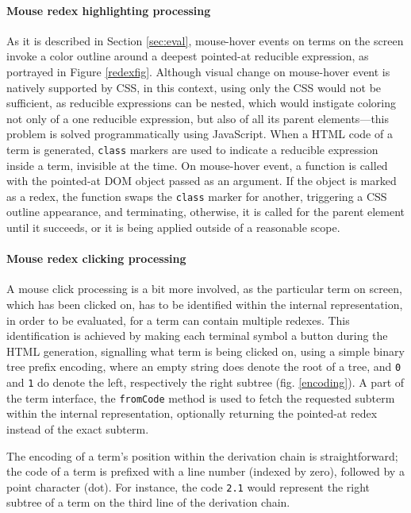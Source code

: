 \documentclass[table, a4paper, 10pt]{book}
\begin{document}
\paragraph{Mouse redex highlighting processing}
As it is described in Section \ref{sec:eval}, mouse-hover events on terms on the screen
invoke a color outline around a deepest pointed-at reducible expression, as
portrayed in Figure \ref{redexfig}. Although visual
change on mouse-hover event is natively supported by CSS,
in this context, using only the CSS would not be sufficient, as
reducible expressions can be nested, which would
instigate coloring not only of a one reducible expression, but also
of all its parent elements---this problem is solved
programmatically using JavaScript. When a HTML code of a term is 
generated, \texttt{class} markers are used to indicate a reducible expression
inside a term,
invisible at the time. On mouse-hover event, a function is called with
the pointed-at DOM object passed as an argument. If the object is marked
as a redex, the function swaps the \texttt{class} marker for another,
triggering a CSS outline appearance, and terminating, otherwise, it is called for the parent element
until it succeeds, or it is being applied outside of a reasonable scope.

\paragraph{Mouse redex clicking processing}
A mouse click processing is a bit more involved, as the particular
term on screen, which has been clicked on, has to be identified
within the internal representation,
in order to be evaluated, for a term can contain multiple redexes. This identification is achieved by
making each terminal symbol a button during the HTML generation,
signalling what term is being clicked on, using a simple binary tree
prefix encoding, where an empty string does denote the root of a tree,
and \texttt{0} and \texttt{1} do denote the left, respectively the right subtree (fig. \ref{encoding}).
A part of the term interface, the \texttt{fromCode} method is used
to fetch the requested subterm within the internal representation, optionally
returning the pointed-at redex instead of the exact subterm.

The encoding of a term's position within the derivation chain is straightforward;
the code of a term is prefixed with a line number (indexed by zero), followed by a point character (dot). For instance,
the code \texttt{2.1} would represent the right subtree of a term on the third line
of the derivation chain.
\end{document}
